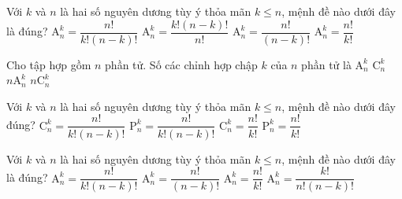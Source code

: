 \begin{ex}%
	Với $k$ và $n$ là hai số nguyên dương tùy ý thỏa mãn $k\le n$, mệnh đề nào dưới đây là đúng?
	\choice
	{$\mathrm{A}_n^k=\dfrac{n!}{k!(n-k)!}$}
	{$\mathrm{A}_n^k=\dfrac{k!(n-k)!}{n!}$}
	{\True $\mathrm{A}_n^k=\dfrac{n!}{(n-k)!}$}
	{$\mathrm{A}_n^k=\dfrac{n!}{k!}$}
\end{ex}%
\begin{ex}%
	Cho tập hợp gồm $n$ phần tử. Số các chỉnh hợp chập $k$ của $n$ phần tử là
	\choice
	{\True $\mathrm{A}_n^k$}
	{$\mathrm{C}_n^k$}
	{$n\mathrm{A}_n^k$}
	{$n\mathrm{C}_n^k$}
\end{ex}%
\begin{ex}%
	Với $k$ và $n$ là hai số nguyên dương tùy ý thỏa mãn $k\le n$, mệnh đề nào dưới đây đúng?
	\choice
	{\True $\mathrm{C}_n^k=\dfrac{n!}{k!(n-k)!}$}
	{$\mathrm{P}_n^k=\dfrac{n!}{k!(n-k)!}$}
	{$\mathrm{C}_n^k=\dfrac{n!}{k!}$}
	{$\mathrm{P}_n^k=\dfrac{n!}{k!}$}
\end{ex}%
\begin{ex}%
	Với $k$ và $n$ là hai số nguyên dương tùy ý thỏa mãn $k\le n$, mệnh đề nào dưới đây là đúng?
	\choice
	{$\mathrm{A}_n^k = \dfrac{n!}{k!(n-k)!}$}
	{\True $\mathrm{A}_n^k = \dfrac{n!}{(n-k)!}$}
	{$\mathrm{A}_n^k = \dfrac{n!}{k!}$}
	{$\mathrm{A}_n^k = \dfrac{k!}{n! (n-k)!}$}
\end{ex}